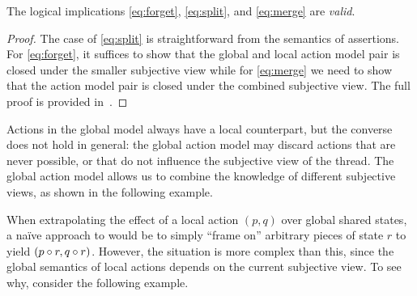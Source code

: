 \begin{lemma}\label{lem:semprinciples}
  The logical implications \eqref{eq:forget}, \eqref{eq:split}, and \eqref{eq:merge} are \emph{valid}.
\end{lemma}
\begin{proof}
The case of \eqref{eq:split} is straightforward from the semantics of assertions.
For \eqref{eq:forget}, it suffices to show that the global and local action model pair is closed under the smaller subjective view while for \eqref{eq:merge} we need to show that the action model pair is closed under the combined subjective view. The full proof is provided in~\cite{colosl-tr14}.
\end{proof}



Actions in the global model always have a local counterpart, but the
converse does not hold in general: the global action model may discard
actions that are never possible, or that do not influence the
subjective view of the thread. The global action model allows us to
combine the knowledge of different subjective views, as shown  in the
following example.

When extrapolating the effect of a local action $(p,q)$ over global
shared states, a naïve approach to would be to simply ``frame on''
arbitrary pieces of state $r$ to yield $(p\circ r, q\circ r)$.
However, the situation is more complex than this, since the global
semantics of local actions depends on the current subjective view. To
see why, consider the following example.


